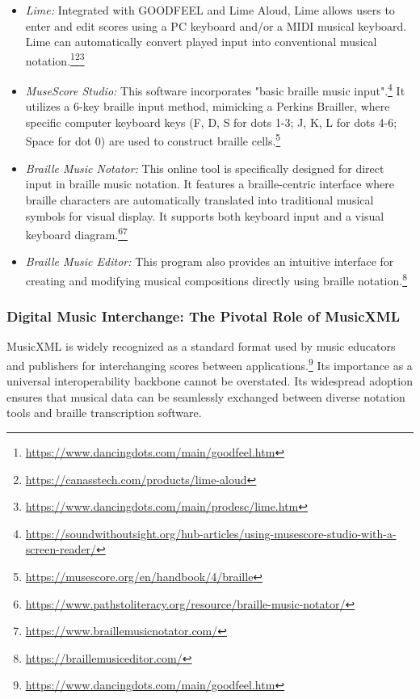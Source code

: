 \begin{itemize}
    \item \emph{Lime:} Integrated with GOODFEEL and Lime Aloud, Lime allows users to enter and edit scores using a PC keyboard and/or a MIDI musical keyboard. Lime can automatically convert played input into conventional musical notation.\footnote{\url{https://www.dancingdots.com/main/goodfeel.htm}}\footnote{\url{https://canasstech.com/products/lime-aloud}}\footnote{\url{https://www.dancingdots.com/main/prodesc/lime.htm}}
    \item \emph{MuseScore Studio:} This software incorporates "basic braille music input".\footnote{\url{https://soundwithoutsight.org/hub-articles/using-musescore-studio-with-a-screen-reader/}} It utilizes a 6-key braille input method, mimicking a Perkins Brailler, where specific computer keyboard keys (F, D, S for dots 1-3; J, K, L for dots 4-6; Space for dot 0) are used to construct braille cells.\footnote{\url{https://musescore.org/en/handbook/4/braille}}
    \item \emph{Braille Music Notator:} This online tool is specifically designed for direct input in braille music notation. It features a braille-centric interface where braille characters are automatically translated into traditional musical symbols for visual display. It supports both keyboard input and a visual keyboard diagram.\footnote{\url{https://www.pathstoliteracy.org/resource/braille-music-notator/}}\footnote{\url{https://www.braillemusicnotator.com/}}
    \item \emph{Braille Music Editor:} This program also provides an intuitive interface for creating and modifying musical compositions directly using braille notation.\footnote{\url{https://braillemusiceditor.com/}}
\end{itemize}

\subsubsection{Digital Music Interchange: The Pivotal Role of MusicXML}
MusicXML is widely recognized as a standard format used by music educators and publishers for interchanging scores between applications.\footnote{\url{https://www.dancingdots.com/main/goodfeel.htm}} Its importance as a universal interoperability backbone cannot be overstated. Its widespread adoption ensures that musical data can be seamlessly exchanged between diverse notation tools and braille transcription software.

